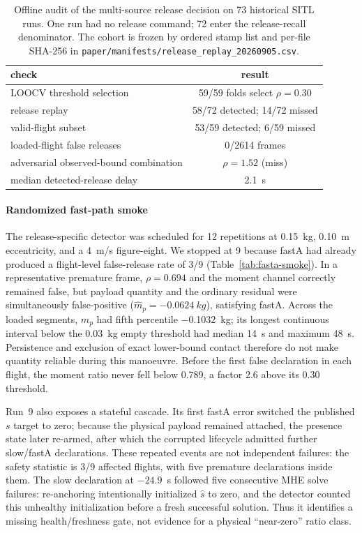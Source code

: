 \begin{table}[t]
\caption{Offline audit of the multi-source release decision on 73 historical SITL
runs. One run had no release command; 72 enter the release-recall denominator. The
cohort is frozen by ordered stamp list and per-file SHA-256 in
\texttt{paper/manifests/release\_replay\_20260905.csv}.}
\label{tab:release-replay}
\centering
\begin{tabular}{@{}lc@{}}
\toprule
check & result \\
\midrule
LOOCV threshold selection & 59/59 folds select $\rho=0.30$ \\
release replay & 58/72 detected; 14/72 missed \\
valid-flight subset & 53/59 detected; 6/59 missed \\
loaded-flight false releases & 0/2614 frames \\
adversarial observed-bound combination & $\rho=1.52$ (miss) \\
median detected-release delay & \SI{2.1}{s} \\
\bottomrule
\end{tabular}
\end{table}

\paragraph{Randomized fast-path smoke} The release-specific detector was scheduled for 12
repetitions at \SI{0.15}{kg}, \SI{0.10}{m} eccentricity, and a \SI{4}{m/s} figure-eight. We
stopped at 9 because fastA had already produced a flight-level false-release rate of 3/9
(Table~\ref{tab:fasta-smoke}). In a representative premature frame,
$\rho=0.694$ and the moment channel correctly remained false, but payload quantity and the
ordinary residual were simultaneously false-positive
($\hat m_p=\SI{-0.0624}{kg}$), satisfying fastA. Across the loaded segments,
$\hat m_p$ had fifth percentile \SI{-0.1032}{kg}; its longest continuous interval below the
\SI{0.03}{kg} empty threshold had median \SI{14}{s} and maximum \SI{48}{s}. Persistence and
exclusion of exact lower-bound contact therefore do not make quantity reliable during this
manoeuvre. Before the first false declaration in each flight, the moment ratio never fell below
0.789, a factor 2.6 above its 0.30 threshold.

Run~9 also exposes a stateful cascade. Its first fastA error switched the published $s$ target
to zero; because the physical payload remained attached, the presence state later re-armed,
after which the corrupted lifecycle admitted further slow/fastA declarations. These repeated
events are not independent failures: the safety statistic is 3/9 affected flights, with five
premature declarations inside them. The slow declaration at $-24.9$~s followed five consecutive
MHE solve failures: re-anchoring intentionally initialized $\hat s$ to zero, and the detector
counted this unhealthy initialization before a fresh successful solution. Thus it identifies a
missing health/freshness gate, not evidence for a physical ``near-zero'' ratio class.

